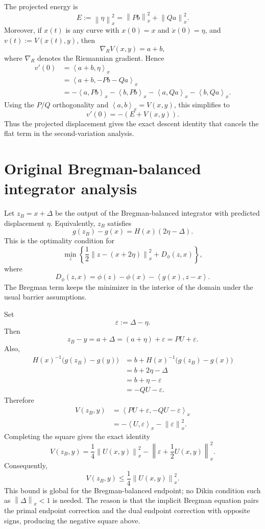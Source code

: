 \documentclass[11pt]{article}
\newcommand{\ip}[2]{\left\langle #1,#2\right\rangle}
\newcommand{\norm}[1]{\left\lVert #1\right\rVert}
\begin{document}
The projected energy is
\[
    E:=\norm{\eta}_x^2
    =\norm{Pb}_x^2+\norm{Qa}_x^2.
\]
Moreover, if $x(t)$ is any curve with $x(0)=x$ and $\dot x(0)=\eta$, and $v(t):=V(x(t),y)$, then
\[
    \nabla_R V(x,y)=a+b,
\]
where $\nabla_R$ denotes the Riemannian gradient. Hence
\[
\begin{aligned}
    v'(0)
    &=\ip{a+b}{\eta}_x \\
    &=\ip{a+b}{-Pb-Qa}_x \\
    &=-\ip{a}{Pb}_x-\ip{b}{Pb}_x-\ip{a}{Qa}_x-\ip{b}{Qa}_x.
\end{aligned}
\]
Using the $P/Q$ orthogonality and $\ip{a}{b}_x=V(x,y)$, this simplifies to
\[
    \boxed{v'(0)=-(E+V(x,y)).}
\]
Thus the projected displacement gives the exact descent identity that cancels the flat term in the second-variation analysis.

\section{Original Bregman-balanced integrator analysis}

Let $z_B=x+\Delta$ be the output of the Bregman-balanced integrator with predicted displacement $\eta$. Equivalently, $z_B$ satisfies
\[
    g(z_B)-g(x)=H(x)(2\eta-\Delta).
\]
This is the optimality condition for
\[
    \min_z\left\{
    \frac12\norm{z-(x+2\eta)}_x^2+D_\phi(z,x)
    \right\},
\]
where
\[
    D_\phi(z,x)=\phi(z)-\phi(x)-\ip{g(x)}{z-x}.
\]
The Bregman term keeps the minimizer in the interior of the domain under the usual barrier assumptions.

Set
\[
    \varepsilon:=\Delta-\eta.
\]
Then
\[
    z_B-y=a+\Delta=(a+\eta)+\varepsilon=PU+\varepsilon.
\]
Also,
\[
\begin{aligned}
    H(x)^{-1}\bigl(g(z_B)-g(y)\bigr)
    &=b+H(x)^{-1}\bigl(g(z_B)-g(x)\bigr) \\
    &=b+2\eta-\Delta \\
    &=b+\eta-\varepsilon \\
    &=-QU-\varepsilon.
\end{aligned}
\]
Therefore
\[
\begin{aligned}
    V(z_B,y)
    &=\ip{PU+\varepsilon}{-QU-\varepsilon}_x \\
    &=-\ip{U}{\varepsilon}_x-\norm{\varepsilon}_x^2.
\end{aligned}
\]
Completing the square gives the exact identity
\[
    \boxed{
    V(z_B,y)
    =
    \frac14\norm{U(x,y)}_x^2
    -
    \left\|\varepsilon+\frac12U(x,y)\right\|_x^2.
    }
\]
Consequently,
\[
    \boxed{V(z_B,y)\le \frac14\norm{U(x,y)}_x^2.}
\]
This bound is global for the Bregman-balanced endpoint; no Dikin condition such as $\norm{\Delta}_x<1$ is needed. The reason is that the implicit Bregman equation pairs the primal endpoint correction and the dual endpoint correction with opposite signs, producing the negative square above.
\end{document}
